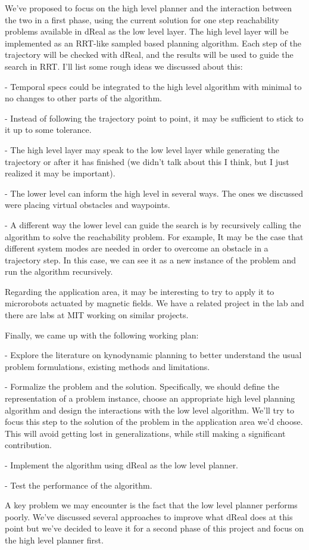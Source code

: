 \documentclass[12pt]{article}
\begin{document}
We've proposed to focus on the high level planner and the interaction between the two in a first phase, using the current solution for one step reachability problems available in dReal as the low level layer. The high level layer will be implemented as an RRT-like sampled based planning algorithm. Each step of the trajectory will be checked with dReal, and the results will be used to guide the search in RRT. I'll list some rough ideas we discussed about this:

- Temporal specs could be integrated to the high level algorithm with minimal to no changes to other parts of the algorithm.

- Instead of following the trajectory point to point, it may be sufficient to stick to it up to some tolerance.

- The high level layer may speak to the low level layer while generating the trajectory or after it has finished (we didn't talk about this I think, but I just realized it may be important).

- The lower level can inform the high level in several ways. The ones we discussed were placing virtual obstacles and waypoints.

- A different way the lower level can guide the search is by recursively calling the algorithm to solve the reachability problem. For example, It may be the case that different system modes are needed in order to overcome an obstacle in a trajectory step. In this case, we can see it as a new instance of the problem and run the algorithm recursively.

Regarding the application area, it may be interesting to try to apply it to microrobots actuated by magnetic fields. We have a related project in the lab and there are labs at MIT working on similar projects.

Finally, we came up with the following working plan:

- Explore the literature on kynodynamic planning to better understand the usual problem formulations, existing methods and limitations.

- Formalize the problem and the solution. Specifically, we should define the representation of a problem instance, choose an appropriate high level planning algorithm and design the interactions with the low level algorithm. We'll try to focus this step to the solution of the problem in the application area we'd choose. This will avoid getting lost in generalizations, while still making a significant contribution.

- Implement the algorithm using dReal as the low level planner.

- Test the performance of the algorithm.

A key problem we may encounter is the fact that the low level planner performs poorly. We've discussed several approaches to improve what dReal does at this point but we've decided to leave it for a second phase of this project and focus on the high level planner first.
\fi
\end{document}
